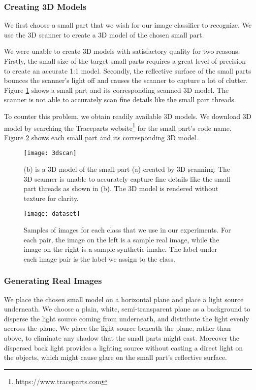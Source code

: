 \subsubsection{Creating 3D Models}
We first choose a small part that we wish for our image classifier to recognize. We use the 3D scanner to create a 3D model of the chosen small part.

We were unable to create 3D models with satisfactory quality for two reasons. Firstly, the small size of the target small parts requires a great level of precision to create an accurate 1:1 model. Secondly, the reflective surface of the small parts bounces the scanner's light off and causes the scanner to capture a lot of clutter. Figure \ref{fig:3dscans} shows a small part and its corresponding scanned 3D model. The scanner is not able to accurately scan fine details like the small part threads.

To counter this problem, we obtain readily available 3D models. We download 3D model by searching the Traceparts website\footnote{https://www.traceparts.com} for the small part's code name. Figure \ref{fig:Dataset} shows each small part and its corresponding 3D model. 

\begin{figure}[H]
\centering
  \texttt{[image: 3dscan]}
\caption{(b) is a 3D model of the small part (a) created by 3D scanning. The 3D scanner is unable to accurately capture fine details like the small part threads as shown in (b). The 3D model is rendered without texture for clarity.}
\label{fig:3dscans}
\end{figure}

\begin{figure}[H]
\centering
  \texttt{[image: dataset]}
\caption{Samples of images for each class that we use in our experiments. For each pair, the image on the left is a sample real image, while the image on the right is a sample synthetic imahe. The label under each image pair is the label we assign to the class.}
\label{fig:Dataset}
\end{figure}

\subsubsection{Generating Real Images}
We place the chosen small model on a horizontal plane and place a light source underneath. We choose a plain, white, semi-transparent plane as a background to disperse the light source coming from underneath, and distribute the light evenly accross the plane. We place the light source beneath the plane, rather than above, to eliminate any shadow that the small parts might cast. Moreover the dispersed back light provides a lighting source without casting a direct light on the objects, which might cause glare on the small part's reflective surface.


